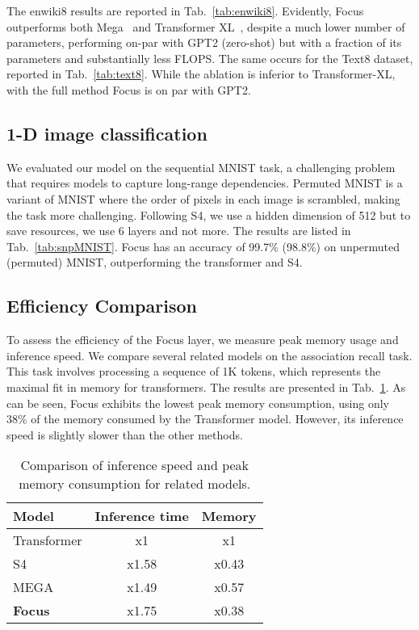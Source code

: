 \documentclass[11pt]{article}
\begin{document}
The enwiki8 results are reported in Tab.~\ref{tab:enwiki8}. Evidently, Focus outperforms both Mega~\cite{ma2022mega} and Transformer XL~\cite{dai2019transformer}, despite a much lower number of parameters, performing on-par with GPT2\cite{Radford2019LanguageMA} (zero-shot) but with a fraction of its parameters and substantially less FLOPS. 
The same occurs for the Text8 dataset, reported in Tab.~\ref{tab:text8}. While the ablation is inferior to Transformer-XL, with the full method Focus is on par with GPT2.

\subsection{1-D image classification}
We evaluated our model on the sequential MNIST task, a challenging problem that requires models to capture long-range dependencies. Permuted MNIST is a variant of MNIST where the order of pixels in each image is scrambled, making the task more challenging. Following S4, we use a hidden dimension of 512 but to save resources, we use 6 layers and not more. The results are listed in Tab.~\ref{tab:snpMNIST}. Focus has an accuracy of 99.7\% (98.8\%) on unpermuted (permuted) MNIST, outperforming the transformer and S4. 




\subsection{Efficiency Comparison}
To assess the efficiency of the Focus layer, we measure peak memory usage and inference speed. We compare several related models on the association recall task. This task involves processing a sequence of 1K tokens, which represents the maximal fit in memory for transformers. The results are presented in Tab.~\ref{tab:comparisonEff}. As can be seen, Focus exhibits the lowest peak memory consumption, using only 38\% of the memory consumed by the Transformer model. However, its inference speed is slightly slower than the other methods. 
\begin{table}[t]
\centering
\begin{tabular}{@{}l@{}c@{~}c@{}}
\toprule
\textbf{Model} & Inference time & Memory \\
\midrule
Transformer & x1 & x1 \\
S4 & x1.58 & x0.43 \\
MEGA & x1.49 & x0.57 \\
\textbf{Focus} & x1.75 & x0.38 \\
\bottomrule
\end{tabular}
\caption{Comparison of inference speed and peak memory consumption for related models.}
\label{tab:comparisonEff}
\end{table}
\end{document}
